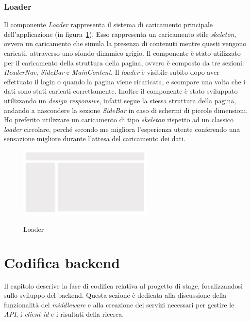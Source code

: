 \subsubsection{Loader}\label{subsubsec:loader}
Il componente \textit{Loader} rappresenta il sistema di caricamento principale dell'applicazione (in figura~\ref{fig:loader}).
Esso rappresenta un caricamento stile \textit{skeleton}, ovvero un caricamento che simula la presenza di contenuti mentre questi vengono caricati, attraverso 
uno sfondo dinamico grigio.
Il componente è stato utilizzato per il caricamento della struttura della pagina, ovvero è composto da tre sezioni: \textit{HeaderNav}, \textit{SideBar} e
\textit{MainContent}. Il \textit{loader} è visibile subito dopo aver effettuato il login o quando la pagina viene ricaricata, e scompare una volta che i dati sono stati caricati correttamente.
Inoltre il componente è stato sviluppato utilizzando un \textit{design responsive}, infatti segue la stessa struttura della pagina, andando a nascondere la sezione 
\textit{SideBar} in caso di schermi di piccole dimensioni.
Ho preferito utilizzare un caricamento di tipo \textit{skeleton} rispetto ad un classico \textit{loader} circolare, perché secondo me migliora l'esperienza utente 
conferendo una sensazione migliore durante l'attesa del caricamento dei dati.

\begin{figure}[ht]
  \centering
  \includegraphics[width=0.6\textwidth, alt={Skeleton loader di caricamento principale dell'applicazione}]{images/frontend/Loader.jpg}
  \caption{Loader}\label{fig:loader}
\end{figure}
\pagebreak

\section{Codifica backend}\label{sec:codifica-backend}
Il capitolo descrive la fase di codifica relativa al progetto di stage, focalizzandosi sullo sviluppo del backend. Questa sezione è dedicata alla discussione 
della funzionalità del \textit{middleware} e alla creazione dei servizi necessari per gestire le \textit{API}, i \textit{client-id} e i risultati della ricerca.


